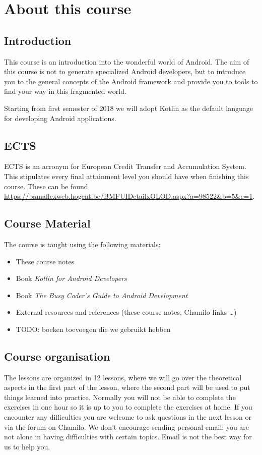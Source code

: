 \chapter{About this course}

\section{Introduction}
This course is an introduction into the wonderful world of Android. The aim of this course is not to generate specialized Android developers, but to introduce you to the general concepts of the Android framework and provide you to tools to find your way in this fragmented world. 

Starting from first semester of 2018 we will adopt Kotlin as the default language for developing Android applications. 

\section{ECTS}
ECTS is an acronym for European Credit Transfer and Accumulation System. This stipulates every final attainment level you should have when finishing this course. These can be found \href{here}{https://bamaflexweb.hogent.be/BMFUIDetailxOLOD.aspx?a=98522\&b=5\&c=1}. 

\section{Course Material}
The course is taught using the following materials:

\begin{itemize}
	\item These course notes
	\item Book \textit{Kotlin for Android Developers} \cite{Leiva2018}
	\item Book  \textit{The Busy Coder's Guide to Android Development} \cite{murphymarkl.2017}
	\item External resources and references (these course notes, Chamilo links \dots)
	\item TODO: boeken toevoegen die we gebruikt hebben
\end{itemize}

\section{Course organisation}
The lessons are organized in 12 lessons, where we will go over the theoretical aspects in the first part of the lesson, where the second part will be used to put things learned into practice. Normally you will not be able to complete the exercises in one hour so it is up to you to complete the exercises at home. If you encounter any difficulties  you are welcome to ask questions in the next lesson or via the forum on Chamilo. We don't encourage sending personal email: you are
not alone in having difficulties with certain topics. Email is not the best way for us to help you.

